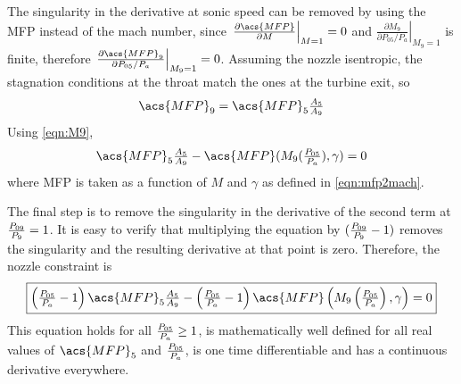 The singularity in the derivative at sonic speed can be removed by using the \ac{MFP} instead of the mach number, since 
$\left.\frac{\partial\acs{MFP}}{\partial M} \right|_{M=1} = 0$ 
and 
$\left.\frac{\partial M_9}{\partial P_{05}/P_a}\right|_{M_9=1}$ is finite, 
therefore $\left.\frac{\partial\acs{MFP}_9}{\partial P_{05}/P_a}\right|_{M_9=1}=0$.
 Assuming the nozzle isentropic, the stagnation conditions at the throat match the ones at the turbine exit, so
\begin{equation}
    \acs{MFP}_9 = \acs{MFP}_5 \tfrac{A_5}{A_9}
\end{equation}
Using \cref{eqn:M9},
\begin{equation}
    \textstyle
    \acs{MFP}_5 \tfrac{A_5}{A_9} - \acs{MFP}(M_9(\pr{05}{a}), \gamma) = 0
\end{equation}
where \acs{MFP} is taken as a function of $M$ and $\gamma$ as defined in \cref{eqn:mfp2mach}.

The final step is to remove the singularity in the derivative of the second term at $\frac{P_{09}}{P_{9}} = 1$. 
It is easy to verify that multiplying the equation by $(\frac{P_{09}}{P_{9}}-1)$ removes the singularity and the resulting derivative at that point is zero. 
Therefore, the nozzle constraint is
\begin{equation}
    \label{eqn:nozzle}
    \boxed{
    \textstyle
        \left(\pr{05}{a}-1\right)\acs{MFP}_5\frac{A_5}{A_9} - \left(\pr{05}{a}-1\right)\acs{MFP}\left(M_9\left(\pr{05}{a}\right), \gamma\right) = 0
    }
\end{equation}
This equation holds for all $\frac{P_{05}}{P_{a}} \geq 1$, is mathematically well defined for all real values of $\acs{MFP}_5$ and $\frac{P_{05}}{P_{a}}$, is one time differentiable and has a continuous derivative everywhere.

